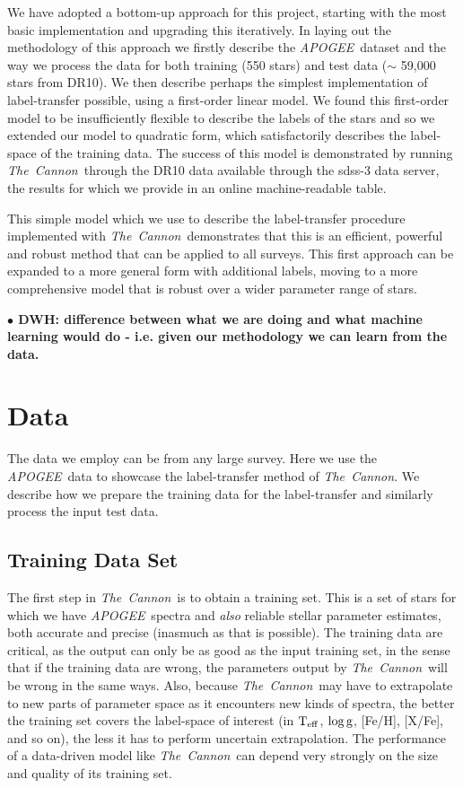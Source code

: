 \documentclass[12pt, preprint]{aastex}
\newcommand{\teff}{\mbox{$\rm T_{eff}$}}
\newcommand{\logg}{\mbox{$\rm \log g$}}
\newcommand{\tc}{\textsl{The~Cannon}}
\newcommand{\apogee}{\textsl{APOGEE}}
\begin{document}
We have adopted a bottom-up approach for this project, starting with the most basic implementation and upgrading this iteratively.  In laying out the methodology of this approach we firstly describe the \apogee\ dataset and the way we process the data for both training (550 stars) and test data ($\sim$ 59,000 stars from DR10). We then describe perhaps the simplest implementation of label-transfer possible, using a first-order linear model. We found this first-order model to be insufficiently flexible to describe the labels of the stars and so we extended our model to quadratic form, which satisfactorily describes the label-space of the training data. The success of this model is demonstrated by running \tc\ through the DR10 data available through the sdss-3 data server, the results for which we provide in an online machine-readable table. %

This simple model which we use to describe the label-transfer procedure implemented with \tc\, demonstrates that this is an efficient, powerful and robust method that can be applied to all surveys. This first approach can be expanded to a more general form with additional labels, moving to a more comprehensive model that is robust over a wider parameter range of stars. 


\textbf{$\bullet$ DWH: difference between what we are doing and what machine learning would do - i.e. given our methodology we can learn from the data. }


\section{Data}

The data we employ can be from any large survey. Here we use the \apogee\ data to showcase the label-transfer method of \tc . We describe how we prepare the training data for the label-transfer and similarly process the input test data.

\subsection{Training Data Set}

The first step in \tc\ is to
obtain a training set. This is a set of stars for which we have \apogee\ spectra and
\emph{also} reliable stellar parameter estimates, both accurate and
precise (inasmuch as that is possible).
The training data are critical, as the output can only be as good as
the input training set, in the sense that if the training data are
wrong, the parameters output by \tc\ will be wrong in the same ways.
Also, because \tc\ may have to extrapolate to new parts of parameter
space as it encounters new kinds of spectra, the better the training
set covers the label-space of interest (in \teff, \logg, [Fe/H],
[X/Fe], and so on), the less it has to perform uncertain
extrapolation.
The performance of a data-driven model like \tc\ can depend very
strongly on the size and quality of its training set.
\end{document}
